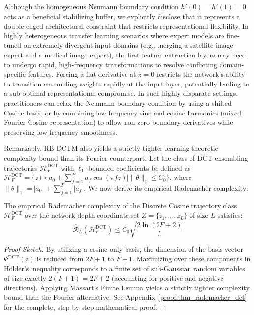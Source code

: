 \begin{remark}
Although the homogeneous Neumann boundary condition $h'(0) = h'(1) = 0$ acts as a beneficial stabilizing buffer, we explicitly disclose that it represents a double-edged architectural constraint that restricts representational flexibility. In highly heterogeneous transfer learning scenarios where expert models are fine-tuned on extremely divergent input domains (e.g., merging a satellite image expert and a medical image expert), the first feature-extraction layers may need to undergo rapid, high-frequency transformations to resolve conflicting domain-specific features. Forcing a flat derivative at $z=0$ restricts the network's ability to transition ensembling weights rapidly at the input layer, potentially leading to a sub-optimal representational compromise. In such highly disparate settings, practitioners can relax the Neumann boundary condition by using a shifted Cosine basis, or by combining low-frequency sine and cosine harmonics (mixed Fourier-Cosine representation) to allow non-zero boundary derivatives while preserving low-frequency smoothness.
\end{remark}

Remarkably, RB-DCTM also yields a strictly tighter learning-theoretic complexity bound than its Fourier counterpart. Let the class of DCT ensembling trajectories $\mathcal{H}_F^{\text{DCT}}$ with $\ell_1$-bounded coefficients be defined as $\mathcal{H}_F^{\text{DCT}} = \{ z \mapsto a_0 + \sum_{f=1}^F a_f \cos(\pi f z) \mid \|\theta\|_1 \le C_0 \}$, where $\|\theta\|_1 = |a_0| + \sum_{f=1}^F |a_f|$. We now derive its empirical Rademacher complexity:

\begin{theorem}
\label{thm:rademacher_dct}
The empirical Rademacher complexity of the Discrete Cosine trajectory class $\mathcal{H}_F^{\text{DCT}}$ over the network depth coordinate set $Z = \{z_1, \dots, z_L\}$ of size $L$ satisfies:
\begin{equation}
    \widehat{\mathcal{R}}_L(\mathcal{H}_F^{\text{DCT}}) \le C_0 \sqrt{\frac{2 \ln(2F+2)}{L}}
\end{equation}
\end{theorem}

\begin{proof}[Proof Sketch]
By utilizing a cosine-only basis, the dimension of the basis vector $\Psi^{\text{DCT}}(z)$ is reduced from $2F+1$ to $F+1$. Maximizing over these components in H{\"o}lder's inequality corresponds to a finite set of sub-Gaussian random variables of size exactly $2(F+1) = 2F+2$ (accounting for positive and negative directions). Applying Massart's Finite Lemma yields a strictly tighter complexity bound than the Fourier alternative. See Appendix~\ref{proof:thm_rademacher_dct} for the complete, step-by-step mathematical proof.
\end{proof}


